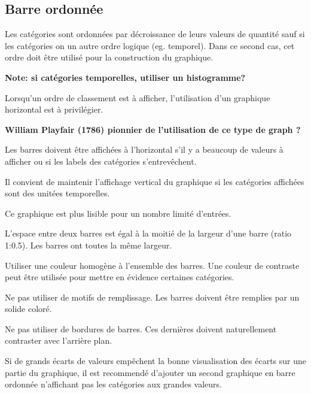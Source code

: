 \documentclass[a4paper,12pt]{article}
\begin{document}
\begin{multicols}{2}
\subsection*{Barre ordonnée}
\label{sec:org572b789}
Les catégories sont ordonnées par décroissance de leurs valeurs de quantité\autocite{jonathanschwabishComparingCategories2021} sauf si les catégories on un autre ordre logique (eg. temporel). Dans ce second cas, cet ordre doit être utilisé pour la construction du graphique. \autocite{wilkeVisualizingAmounts2019}

\textbf{Note: si catégories temporelles, utiliser un histogramme?}

Lorsqu'un ordre de classement est à afficher, l'utilisation d'un graphique horizontal est à privilégier. \autocite{andreaskrauseBestPracticesData2024}

\textbf{William Playfair (1786) pionnier de l'utilisation de ce type de graph ?}

Les barres doivent être affichées à l'horizontal s'il y a beaucoup de valeurs à afficher ou si les labels des catégories s'entrevêchent. \autocite{alansmithLexiqueVisuel,sosulskiGraphics2019,wilkeVisualizingAmounts2019,stephenfewComponentlevelGraphDesign2012,jonathanschwabishComparingCategories2021}

Il convient de maintenir l'affichage vertical du graphique si les catégories affichées sont des unitées temporelles. \autocite{stephenfewComponentlevelGraphDesign2012}

Ce graphique est plus lisible pour un nombre limité d'entrées. \autocite{mikeyiHowChooseRight2020}

L'espace entre deux barres est égal à la moitié de la largeur d'une barre (ratio 1:0.5). Les barres ont toutes la même largeur. \autocite{stephenfewComponentlevelGraphDesign2012}

Utiliser une couleur homogène à l'ensemble des barres. Une couleur de contraste peut être utilisée pour mettre en évidence certaines catégories.

Ne pas utiliser de motifs de remplissage. Les barres doivent être remplies par un solide coloré. \autocite{stephenfewComponentlevelGraphDesign2012}

Ne pas utiliser de bordures de barres. Ces dernières doivent naturellement contraster avec l'arrière plan.

Si de grands écarts de valeurs empêchent la bonne visualisation des écarts sur une partie du graphique, il est recommendé d'ajouter un second graphique en barre ordonnée n'affichant pas les catégories aux grandes valeurs. \autocite{jonathanschwabishComparingCategories2021}


\end{multicols}
\end{document}

